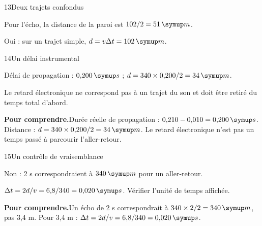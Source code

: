 \par\noindent\begin{minipage}{\linewidth}
\begin{corrige}{13}{Deux trajets confondus}
\begin{questions}
\item Pour l’écho, la distance de la paroi est $102/2=51\unite m$.
\item Oui : sur un trajet simple, $d=v\Delta t=102\unite m$.
\end{questions}
\end{corrige}
\end{minipage}
\par\noindent\begin{minipage}{\linewidth}
\begin{corrige}{14}{Un délai instrumental}
\begin{questions}
\item Délai de propagation : $0{,}200\unite s$ ; $d=340\times0{,}200/2=34\unite m$.
\item Le retard électronique ne correspond pas à un trajet du son et doit être retiré du temps total d’abord.
\end{questions}
\par\smallskip\noindent\textbf{Pour comprendre.}\enspace Durée réelle de propagation : $0{,}210-0{,}010=0{,}200\unite s$. Distance : $d=340\times0{,}200/2=34\unite m$. Le retard électronique n’est pas un temps passé à parcourir l’aller-retour.\par
{}
\end{corrige}
\end{minipage}
\par\noindent\begin{minipage}{\linewidth}
\begin{corrige}{15}{Un contrôle de vraisemblance}
\begin{questions}
\item Non : 2 s correspondraient à $340\unite m$ pour un aller-retour.
\item $\Delta t=2d/v=6{,}8/340=0{,}020\unite s$. Vérifier l’unité de temps affichée.
\end{questions}
\par\smallskip\noindent\textbf{Pour comprendre.}\enspace Un écho de 2 s correspondrait à $340\times2/2=340\unite m$, pas 3,4 m. Pour 3,4 m : $\Delta t=2d/v=6{,}8/340=0{,}020\unite s$.\par
\end{corrige}
\end{minipage}
